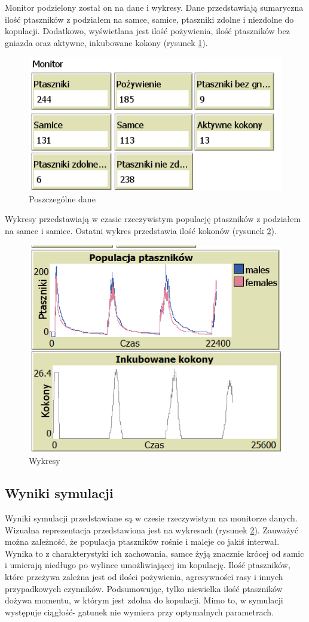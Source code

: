 \documentclass[a4paper,11pt,titlepage]{article}
\begin{document}
\noindent Monitor podzielony został on na dane i wykresy. Dane przedstawiają sumaryczna ilość ptaszników z podziałem na samce, samice, ptaszniki zdolne i niezdolne do kopulacji. Dodatkowo, wyświetlana jest ilość pożywienia, ilość ptaszników bez gniazda oraz aktywne, inkubowane kokony (rysunek \ref{fig:3}).

\begin{figure}[H]
\centering
\includegraphics[width=.5\columnwidth]{img/monitor_danych.PNG}
\caption{Poszczególne dane}
\label{fig:3}
\end{figure}

Wykresy przedstawiają w czasie rzeczywistym populację ptaszników z podziałem na samce i samice. Ostatni wykres przedstawia ilość kokonów (rysunek \ref{fig:10}).
\begin{figure}[H]
\centering
\includegraphics[width=.8\columnwidth]{img/wykresy.PNG}
\caption{Wykresy}
\label{fig:10}
\end{figure}

\subsection{Wyniki symulacji}
Wyniki symulacji przedstawiane są w czesie rzeczywistym na monitorze danych. Wizualna reprezentacja przedstawiona jest na wykresach (rysunek \ref{fig:10}). Zauważyć można zależność, że populacja ptaszników rośnie i maleje co jakiś interwał. Wynika to z charakterystyki ich zachowania, samce żyją znacznie krócej od samic i umierają niedługo po wylince umożliwiającej im kopulację. Ilość ptaszników, które przeżywa zależna jest od ilości pożywienia, agresywności rasy i innych przypadkowych czynników. Podsumowując, tylko niewielka ilość ptaszników dożywa momentu, w którym jest zdolna do kopulacji. Mimo to, w symulacji występuje ciągłość- gatunek nie wymiera przy optymalnych parametrach.
\end{document}
